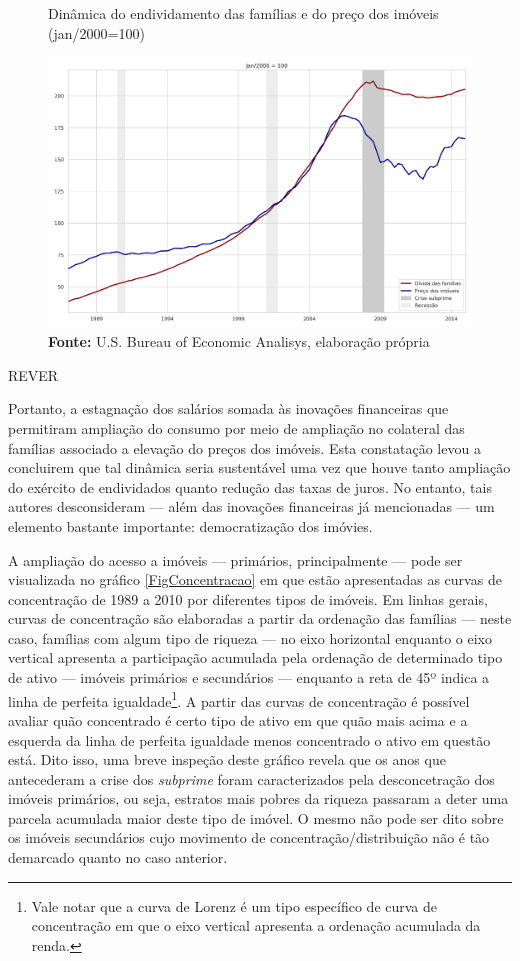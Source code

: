 \begin{figure}[H]
	\centering
	\caption{Dinâmica do endividamento das famílias e do preço dos imóveis (jan/2000=100)}
	\label{FigDividaPreco}
	\includegraphics[width=\textwidth]{../../Dados/Fatos_Estilizados/figs/Divida_PrecoImoveis.png}
	\caption*{\textbf{Fonte:} U.S. Bureau of Economic Analisys, elaboração própria}
\end{figure}

REVER

Portanto, a estagnação dos salários somada às inovações financeiras que permitiram ampliação do consumo por meio de ampliação no colateral das famílias associado a elevação do preços dos imóveis.
Esta constatação levou \textcite{barba_rising_2009} a concluirem que tal dinâmica seria sustentável uma vez que houve tanto ampliação do exército de endividados quanto redução das taxas de juros.
No entanto, tais autores desconsideram --- além das inovações financeiras já mencionadas --- um elemento bastante importante: democratização dos imóvies.

A ampliação do acesso a imóveis --- primários, principalmente --- pode ser visualizada no gráfico \ref{FigConcentracao} em que estão apresentadas as curvas de concentração de 1989 a 2010 por diferentes tipos de imóveis.
Em linhas gerais, curvas de concentração são elaboradas a partir da ordenação das famílias --- neste caso, famílias com algum tipo de riqueza --- no eixo horizontal enquanto o eixo vertical apresenta a participação acumulada  pela ordenação de determinado tipo de ativo --- imóveis primários e secundários --- enquanto a reta de 45º indica a linha de perfeita igualdade\footnote{Vale notar que a curva de Lorenz é um tipo específico de curva de concentração em que o eixo vertical apresenta a ordenação acumulada da renda.}.
A partir das curvas de concentração é possível avaliar quão concentrado é certo tipo de ativo em que quão mais acima e a esquerda da linha de perfeita igualdade menos concentrado o ativo em questão está.
Dito isso, uma breve inspeção deste gráfico revela que os anos que antecederam a crise dos \textit{subprime} foram caracterizados pela desconcetração dos imóveis primários, ou seja, estratos mais pobres da riqueza passaram a deter uma parcela acumulada maior deste tipo de imóvel.
O mesmo não pode ser dito sobre os imóveis secundários cujo movimento de concentração/distribuição não é tão demarcado quanto no caso anterior.



